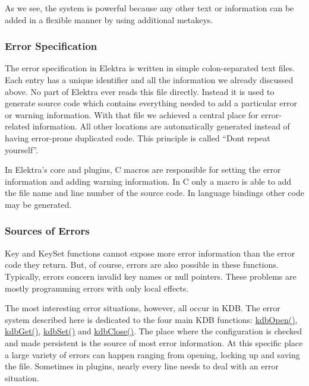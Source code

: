 As we see, the system is powerful because any other text or information can be added in a flexible manner by using additional metakeys.

\subsubsection*{Error Specification}

The error specification in Elektra is written in simple colon-\/separated text files. Each entry has a unique identifier and all the information we already discussed above. No part of Elektra ever reads this file directly. Instead it is used to generate source code which contains everything needed to add a particular error or warning information. With that file we achieved a central place for error-\/related information. All other locations are automatically generated instead of having error-\/prone duplicated code. This principle is called “\+Don\textquotesingle{}t repeat yourself”.

In Elektra’s core and plugins, C macros are responsible for setting the error information and adding warning information. In C only a macro is able to add the file name and line number of the source code. In language bindings other code may be generated.

\subsubsection*{Sources of Errors}

{\ttfamily Key} and {\ttfamily Key\+Set} functions cannot expose more error information than the error code they return. But, of course, errors are also possible in these functions. Typically, errors concern invalid key names or null pointers. These problems are mostly programming errors with only local effects.

The most interesting error situations, however, all occur in {\ttfamily K\+DB}. The error system described here is dedicated to the four main {\ttfamily K\+DB} functions\+: {\ttfamily \hyperlink{group__kdb_ga6808defe5870f328dd17910aacbdc6ca}{kdb\+Open()}}, {\ttfamily \hyperlink{group__kdb_ga28e385fd9cb7ccfe0b2f1ed2f62453a1}{kdb\+Get()}}, {\ttfamily \hyperlink{group__kdb_ga11436b058408f83d303ca5e996832bcf}{kdb\+Set()}} and {\ttfamily \hyperlink{group__kdb_gadb54dc9fda17ee07deb9444df745c96f}{kdb\+Close()}}. The place where the configuration is checked and made persistent is the source of most error information. At this specific place a large variety of errors can happen ranging from opening, locking up and saving the file. Sometimes in plugins, nearly every line needs to deal with an error situation.

